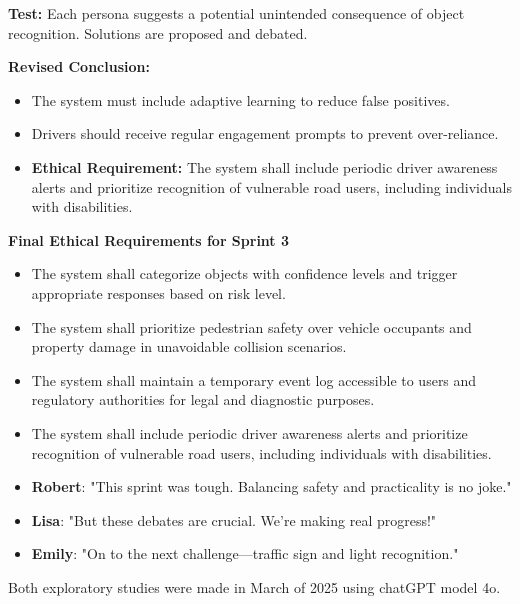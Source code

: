 \begin{tcolorbox}
  \textbf{Test:} Each persona suggests a potential unintended consequence of object recognition. Solutions are proposed and debated.
  
  \textbf{Revised Conclusion:}
  \begin{itemize}
      \item The system must include adaptive learning to reduce false positives.
      \item Drivers should receive regular engagement prompts to prevent over-reliance.
      \item \textbf{Ethical Requirement:} The system shall include periodic driver awareness alerts and prioritize recognition of vulnerable road users, including individuals with disabilities.
  \end{itemize}
  
  \vspace{1em}
  \textbf{Final Ethical Requirements for Sprint 3}
  \begin{itemize}
      \item The system shall categorize objects with confidence levels and trigger appropriate responses based on risk level.
      \item The system shall prioritize pedestrian safety over vehicle occupants and property damage in unavoidable collision scenarios.
      \item The system shall maintain a temporary event log accessible to users and regulatory authorities for legal and diagnostic purposes.
      \item The system shall include periodic driver awareness alerts and prioritize recognition of vulnerable road users, including individuals with disabilities.
  \end{itemize}
  
  \vspace{0.5em}
  \begin{itemize}
      \item \textbf{Robert}: "This sprint was tough. Balancing safety and practicality is no joke."
      \item \textbf{Lisa}: "But these debates are crucial. We’re making real progress!"
      \item \textbf{Emily}: "On to the next challenge—traffic sign and light recognition."
  \end{itemize}
  \end {tcolorbox}
  
Both exploratory studies were made in March of 2025 using chatGPT model 4o.

